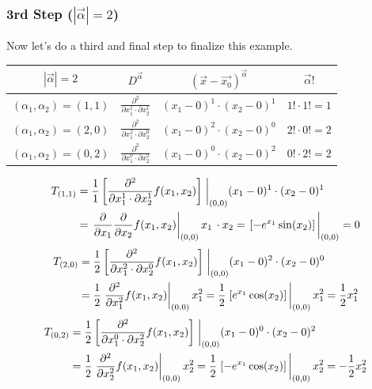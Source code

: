 \documentclass{article}
\begin{document}
	\subsubsection*{3rd Step ($|\vec{\alpha}|=2$)}
	Now let's do a third and final step to finalize this example.
	\begin{table}[h!]
		\centering
		\renewcommand{\arraystretch}{1.5} 
		\begin{tabular}{cccc}
			\hline
			$|\vec{\alpha}|=2$ & $D^{\vec{\alpha}}$ & $\left(\vec{x}-\vec{x_0}\right)^{\vec{\alpha}}$& $\vec{\alpha}!$\\
			\hline
			$(\alpha_1, \alpha_2)=(1, 1)$&$\frac{\partial^2}{\partial x_1^{1}\cdot \partial x_2^{1}}$& $(x_1-0)^1\cdot(x_2-0)^1$ &$1!\cdot 1! = 1$\\
			$(\alpha_1, \alpha_2)=(2, 0)$&$\frac{\partial^2}{\partial x_1^{2}\cdot \partial x_2^{0}}$& $(x_1-0)^2\cdot(x_2-0)^0$ &$2!\cdot 0! = 2$\\
			$(\alpha_1, \alpha_2)=(0, 2)$&$\frac{\partial^2}{\partial x_1^{0}\cdot \partial x_2^{2}}$& $(x_1-0)^0\cdot(x_2-0)^2$ &$0!\cdot 2! = 2$
		\end{tabular}
		\label{tab:taylor_example_3}
	\end{table}
	\begin{align}
		T_{(1,1)}&=\frac{1}{1}\left[\frac{\partial^2}{\partial x_1^{1}\cdot \partial x_2^{1}}f(x_1, x_2)\right]\eval_{(0,0)}(x_1-0)^1\cdot(x_2-0)^1\\
		&=\eval{\frac{\partial}{\partial x_1}\frac{\partial}{\partial x_2}f(x_1,x_2)}_{(0,0)}x_1\, \cdot x_2=  \eval{\left[-e^{x_1}\sin(x_2)\right]}_{(0,0)}= 0
	\end{align}
	\begin{align}
		T_{(2,0)}&=\frac{1}{2}\left[\frac{\partial^2}{\partial x_1^{2}\cdot \partial x_2^{0}}f(x_1, x_2)\right]\eval_{(0,0)}(x_1-0)^2\cdot(x_2-0)^0\\
		&=\frac{1}{2}\eval{\frac{\partial^2}{\partial x_1^2}f(x_1,x_2)}_{(0,0)}x_1^2 =  \frac{1}{2}\eval{\left[e^{x_1}\cos(x_2)\right]}_{(0,0)}x_1^2=\frac{1}{2}x_1^2
	\end{align}
	\begin{align}
		T_{(0,2)}&=\frac{1}{2}\left[\frac{\partial^2}{\partial x_1^{0}\cdot \partial x_2^{2}}f(x_1, x_2)\right]\eval_{(0,0)}(x_1-0)^0\cdot(x_2-0)^2\\
		&=\frac{1}{2}\eval{\frac{\partial^2}{\partial x_2^2}f(x_1,x_2)}_{(0,0)}x_2^2 = \frac{1}{2} \eval{\left[-e^{x_1}\cos(x_2)\right]}_{(0,0)}x_2^2=-\frac{1}{2}x_2^2
	\end{align}
\end{document}
